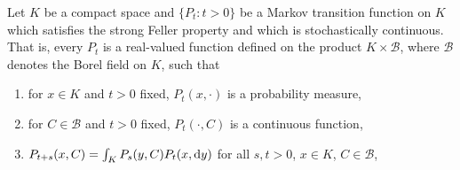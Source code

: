 \begin{example}\label{ex:b4-2.6}
Let $K$ be a compact space and $\{P_t \colon t > 0\}$ be a
Markov transition function on $K$ which satisfies the strong Feller
property and which is stochastically continuous.
That is, every
$P_t$ is a real-valued function defined on the product $K \times \mathcal{B}$, where $\mathcal{B}$
denotes the Borel field on $K$, such that
\begin{enumerate}[\upshape (i)]
    \item 
    for $x \in K$ and $t > 0$ fixed, $P_t(x,\cdot)$ is a probability measure,

    \item 
    for $C \in \mathcal{B}$ and $t > 0$ fixed, $P_t(\cdot,C)$ is a continuous function,

    \item 
    $P_{t+s}(x,C) = \int_K P_s(y,C)P_t(x,\mathop{}\!\mathrm{d}{y})$ for all $s,t > 0$, $x \in K$, $C \in \mathcal{B}$,


\end{enumerate}
\end{example}
